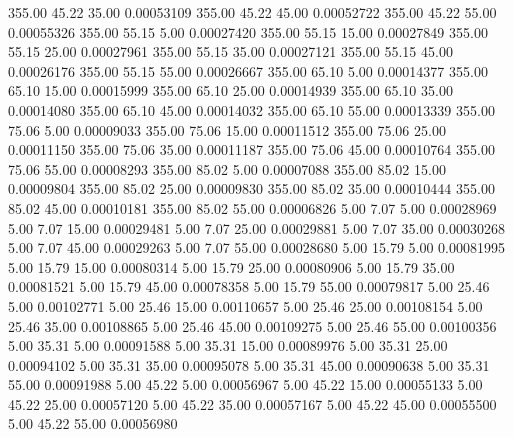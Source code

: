     355.00     45.22     35.00     0.00053109
    355.00     45.22     45.00     0.00052722
    355.00     45.22     55.00     0.00055326
    355.00     55.15      5.00     0.00027420
    355.00     55.15     15.00     0.00027849
    355.00     55.15     25.00     0.00027961
    355.00     55.15     35.00     0.00027121
    355.00     55.15     45.00     0.00026176
    355.00     55.15     55.00     0.00026667
    355.00     65.10      5.00     0.00014377
    355.00     65.10     15.00     0.00015999
    355.00     65.10     25.00     0.00014939
    355.00     65.10     35.00     0.00014080
    355.00     65.10     45.00     0.00014032
    355.00     65.10     55.00     0.00013339
    355.00     75.06      5.00     0.00009033
    355.00     75.06     15.00     0.00011512
    355.00     75.06     25.00     0.00011150
    355.00     75.06     35.00     0.00011187
    355.00     75.06     45.00     0.00010764
    355.00     75.06     55.00     0.00008293
    355.00     85.02      5.00     0.00007088
    355.00     85.02     15.00     0.00009804
    355.00     85.02     25.00     0.00009830
    355.00     85.02     35.00     0.00010444
    355.00     85.02     45.00     0.00010181
    355.00     85.02     55.00     0.00006826
      5.00      7.07      5.00     0.00028969
      5.00      7.07     15.00     0.00029481
      5.00      7.07     25.00     0.00029881
      5.00      7.07     35.00     0.00030268
      5.00      7.07     45.00     0.00029263
      5.00      7.07     55.00     0.00028680
      5.00     15.79      5.00     0.00081995
      5.00     15.79     15.00     0.00080314
      5.00     15.79     25.00     0.00080906
      5.00     15.79     35.00     0.00081521
      5.00     15.79     45.00     0.00078358
      5.00     15.79     55.00     0.00079817
      5.00     25.46      5.00     0.00102771
      5.00     25.46     15.00     0.00110657
      5.00     25.46     25.00     0.00108154
      5.00     25.46     35.00     0.00108865
      5.00     25.46     45.00     0.00109275
      5.00     25.46     55.00     0.00100356
      5.00     35.31      5.00     0.00091588
      5.00     35.31     15.00     0.00089976
      5.00     35.31     25.00     0.00094102
      5.00     35.31     35.00     0.00095078
      5.00     35.31     45.00     0.00090638
      5.00     35.31     55.00     0.00091988
      5.00     45.22      5.00     0.00056967
      5.00     45.22     15.00     0.00055133
      5.00     45.22     25.00     0.00057120
      5.00     45.22     35.00     0.00057167
      5.00     45.22     45.00     0.00055500
      5.00     45.22     55.00     0.00056980
